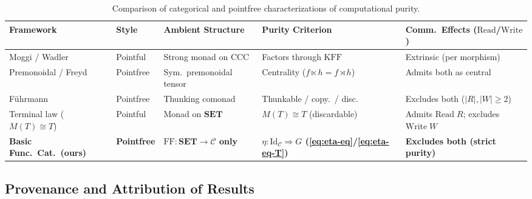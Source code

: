 \documentclass[11pt,a4paper]{article}
\theoremstyle{definition}
\theoremstyle{remark}
\newcommand{\Set}{\mathbf{SET}}
\newcommand{\Id}{\mathrm{Id}}
\newcommand{\FF}{\mathrm{FF}}
\newcommand{\KFF}{\mathrm{KFF}}
\begin{document}
\begin{table}[htbp]
\centering
\scriptsize
\setlength{\tabcolsep}{3.5pt}
\renewcommand{\arraystretch}{1.25}
\begin{tabular}{@{}llllp{3.4cm}@{}}
\toprule
\textbf{Framework} & \textbf{Style} & \textbf{Ambient Structure} & \textbf{Purity Criterion} & \textbf{Comm.\ Effects ($\mathrm{Read}$/$\mathrm{Write}$)} \\
\midrule
Moggi / Wadler~\cite{Moggi1991,Wadler1995} & Pointful & Strong monad on CCC & Factors through $\KFF$ & Extrinsic (per morphism) \\
Premonoidal / Freyd~\cite{PowerRobinson1997,LevyPowerThielecke2003} & Pointfree & Sym.\ premonoidal tensor & Centrality ($f \ltimes h = f \rtimes h$) & Admits both as central \\
Führmann~\cite{Fuhrmann1999} & Pointfree & Thunking comonad & Thunkable / copy.\ / disc. & Excludes both ($|R|, |W| \ge 2$) \\
Terminal law ($M(T) \cong T$) & Pointful & Monad on $\Set$ & $M(T) \cong T$ (discardable) & Admits $\mathrm{Read}\;R$; excludes $\mathrm{Write}\;W$ \\
\textbf{Basic Func.\ Cat.\ (ours)} & \textbf{Pointfree} & \textbf{$\FF : \Set \to \mathcal{C}$ only} & \textbf{$\eta : \Id_{\mathcal{C}} \Rightarrow G$ (\eqref{eq:eta-eq}/\eqref{eq:eta-eq-T})} & \textbf{Excludes both (strict purity)} \\
\bottomrule
\end{tabular}
\caption{Comparison of categorical and pointfree characterizations of computational purity.}
\label{tab:related}
\end{table}

\subsection{Provenance and Attribution of Results}\label{sec:provenance}
\end{document}
